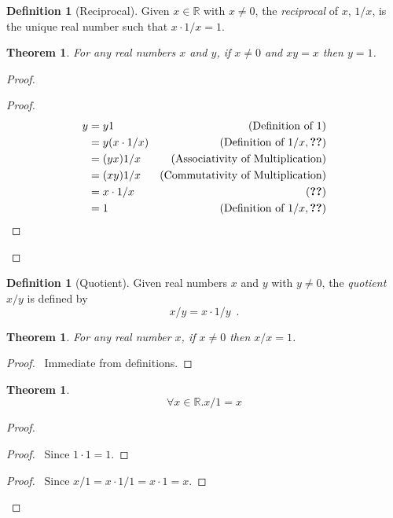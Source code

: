 \documentclass{book}
\let\qed\relax
\newtheorem{thm}[ax]{Theorem}
\theoremstyle{definition}
\newtheorem{df}[ax]{Definition}
\begin{document}
\begin{df}[Reciprocal]
Given $x \in \mathbb{R}$ with $x \neq 0$, the \emph{reciprocal} of $x$, $1/x$, is the unique real number such that $x \cdot 1/x = 1$.
\end{df}

\begin{thm}
For any real numbers $x$ and $y$, if $x \neq 0$ and $xy = x$ then $y = 1$.
\end{thm}

\begin{proof}
\pf
{}
\begin{proof}
	\pf
	\begin{align*}
		y & = y1 & (\text{Definition of } 1) \\
		& = y (x \cdot 1/x) & (\text{Definition of } 1/x, \text{\stepref{2}}) \\
		& = (yx) 1/x & (\text{Associativity of Multiplication}) \\
		& = (xy) 1/x & (\text{Commutativity of Multiplication}) \\
		& = x \cdot 1/x & (\text{\stepref{3}}) \\
		& = 1 & (\text{Definition of } 1/x, \text{\stepref{2}})
	\end{align*}
\end{proof}
\qed
\end{proof}

\begin{df}[Quotient]
Given real numbers $x$ and $y$ with $y \neq 0$, the \emph{quotient} $x/y$ is defined by
\[ x/y = x \cdot 1/y \enspace . \]
\end{df}

\begin{thm}
For any real number $x$, if $x \neq 0$ then $x/x = 1$.
\end{thm}

\begin{proof}
\pf\ Immediate from definitions. \qed
\end{proof}

\begin{thm}
\[ \forall x \in \mathbb{R}. x/1 = x \]
\end{thm}

\begin{proof}
\pf
{}
\begin{proof}
	\pf\ Since $1 \cdot 1 = 1$.
\end{proof}
\begin{proof}
	\pf\ Since $x/1 = x \cdot 1/1 = x \cdot 1 = x$.
\end{proof}
\qed
\end{proof}
\end{document}
